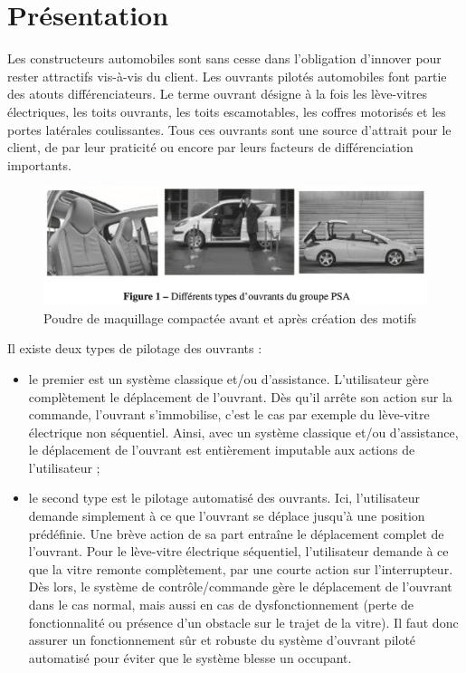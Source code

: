 

\section{Présentation}

Les constructeurs automobiles sont sans cesse dans l'obligation d'innover pour rester attractifs vis-à-vis du client. Les ouvrants pilotés automobiles font partie des atouts différenciateurs. Le terme ouvrant désigne à la fois les lève-vitres électriques, les toits ouvrants, les toits escamotables, les coffres motorisés et les portes latérales coulissantes. Tous ces ouvrants sont une source d'attrait pour le client, de par leur praticité ou encore par leurs facteurs de différenciation importants. 

\begin{figure}[!h]
\centering\includegraphics[width=0.65\linewidth]{img/figure01}
 \caption{Poudre de maquillage compactée avant et après création des motifs}
 \label{img01}
\end{figure}

Il existe deux types de pilotage des ouvrants : 
\begin{itemize}
 \item le premier est un système classique et/ou d'assistance. L'utilisateur gère complètement le déplacement de l'ouvrant. Dès qu'il arrête son action sur la commande, l'ouvrant s'immobilise, c'est le cas par exemple du lève-vitre électrique non séquentiel. Ainsi, avec un système classique et/ou d'assistance, le déplacement de l'ouvrant est entièrement imputable aux actions de l'utilisateur ; 
 \item le second type est le pilotage automatisé des ouvrants. Ici, l'utilisateur demande simplement à ce que l'ouvrant se déplace jusqu'à une position prédéfinie. Une brève action de sa part entraîne le déplacement complet de l'ouvrant. Pour le lève-vitre électrique séquentiel, l'utilisateur demande à ce que la vitre remonte complètement, par une courte action sur l'interrupteur. Dès lors, le système de contrôle/commande gère le déplacement de l'ouvrant dans le cas normal, mais aussi en cas de dysfonctionnement (perte de fonctionnalité ou présence d'un obstacle sur le trajet de la vitre). Il faut donc assurer un fonctionnement sûr et robuste du système d'ouvrant piloté automatisé pour éviter que le système blesse un occupant. 
\end{itemize}

